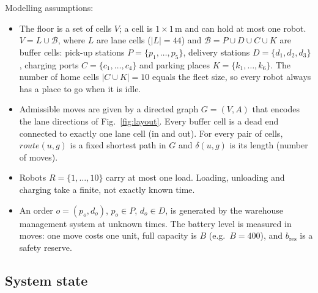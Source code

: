 \documentclass[11pt,a4paper]{article}
\newcommand{\Bf}{\mathcal{B}}
\begin{document}
\noindent Modelling assumptions:
\begin{itemize}[leftmargin=*]
  \item The floor is a set of cells $V$; a cell is $1\times1$\,m and can
        hold at most one robot. $V = L \cup \Bf$, where $L$ are lane cells
        ($|L|=44$) and $\Bf = P\cup D\cup C\cup K$ are buffer cells:
        pick-up stations $P=\{p_1,\dots,p_5\}$, delivery stations
        $D=\{d_1,d_2,d_3\}$, charging ports $C=\{c_1,\dots,c_4\}$ and parking
        places $K=\{k_1,\dots,k_6\}$. The number of home cells
        $|C\cup K| = 10$ equals the fleet size, so every robot always has a
        place to go when it is idle.
  \item Admissible moves are given by a directed graph $G=(V,A)$ that encodes
        the lane directions of Fig.~\ref{fig:layout}. Every buffer cell is a
        dead end connected to exactly one lane cell (in and out). For
        every pair of cells, $\mathit{route}(u,g)$ is a fixed shortest path
        in $G$ and $\delta(u,g)$ is its length (number of moves).
  \item Robots $R=\{1,\dots,10\}$ carry at most one load. Loading, unloading
        and charging take a finite, not exactly known time.
  \item An order $o=(p_o,d_o)$, $p_o\in P$, $d_o\in D$, is generated by the
        warehouse management system at unknown times. The battery level is
        measured in moves: one move costs one unit, full capacity is $B$
        (e.g.\ $B=400$), and $b_{\mathrm{res}}$ is a safety reserve.
\end{itemize}

\subsection{System state}
\end{document}
